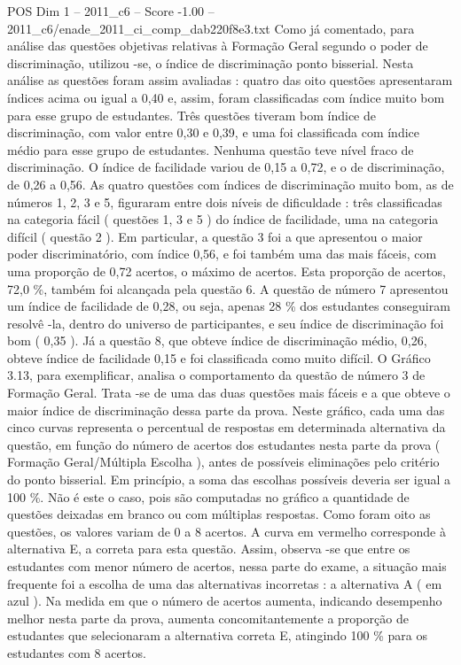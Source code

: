 \begin{textsample}{POS Dim 1 – 2011\_c6 – Score -1.00 – 2011\_c6/enade\_2011\_ci\_comp\_dab220f8e3.txt}
Como já comentado, para análise das questões objetivas relativas à Formação Geral segundo o poder de discriminação, utilizou -se, o índice de discriminação ponto bisserial.
Nesta análise as questões foram assim avaliadas : quatro das oito questões apresentaram índices acima ou igual a 0,40 e, assim, foram classificadas com índice muito bom para esse grupo de estudantes.
Três questões tiveram bom índice de discriminação, com valor entre 0,30 e 0,39, e uma foi classificada com índice médio para esse grupo de estudantes.
Nenhuma questão teve nível fraco de discriminação.
O índice de facilidade variou de 0,15 a 0,72, e o de discriminação, de 0,26 a 0,56.
As quatro questões com índices de discriminação muito bom, as de números 1, 2, 3 e 5, figuraram entre dois níveis de dificuldade : três classificadas na categoria fácil ( questões 1, 3 e 5 ) do índice de facilidade, uma na categoria difícil ( questão 2 ).
Em particular, a questão 3 foi a que apresentou o maior poder discriminatório, com índice 0,56, e foi também uma das mais fáceis, com uma proporção de 0,72 acertos, o máximo de acertos.
Esta proporção de acertos, 72,0 \%, também foi alcançada pela questão 6.
A questão de número 7 apresentou um índice de facilidade de 0,28, ou seja, apenas 28 \% dos estudantes conseguiram resolvê -la, dentro do universo de participantes, e seu índice de discriminação foi bom ( 0,35 ).
Já a questão 8, que obteve índice de discriminação médio, 0,26, obteve índice de facilidade 0,15 e foi classificada como muito difícil.
O Gráfico 3.13, para exemplificar, analisa o comportamento da questão de número 3 de Formação Geral.
Trata -se de uma das duas questões mais fáceis e a que obteve o maior índice de discriminação dessa parte da prova.
Neste gráfico, cada uma das cinco curvas representa o percentual de respostas em determinada alternativa da questão, em função do número de acertos dos estudantes nesta parte da prova ( Formação Geral/Múltipla Escolha ), antes de possíveis eliminações pelo critério do ponto bisserial.
Em princípio, a soma das escolhas possíveis deveria ser igual a 100 \%.
Não é este o caso, pois são computadas no gráfico a quantidade de questões deixadas em branco ou com múltiplas respostas.
Como foram oito as questões, os valores variam de 0 a 8 acertos.
A curva em vermelho corresponde à alternativa E, a correta para esta questão.
Assim, observa -se que entre os estudantes com menor número de acertos, nessa parte do exame, a situação mais frequente foi a escolha de uma das alternativas incorretas : a alternativa A ( em azul ).
Na medida em que o número de acertos aumenta, indicando desempenho melhor nesta parte da prova, aumenta concomitantemente a proporção de estudantes que selecionaram a alternativa correta E, atingindo 100 \% para os estudantes com 8 acertos.

\end{textsample}

